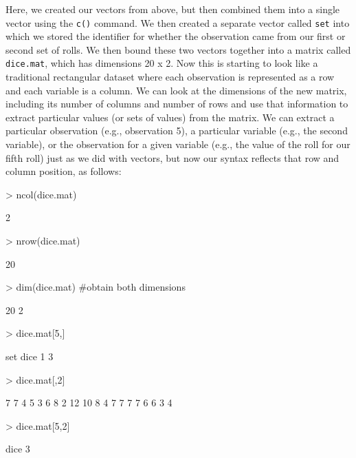\documentclass[12pt]{article}
\begin{document}
Here, we created our vectors from above, but then combined them into a single vector using the \verb|c()| command. We then created a separate vector called \verb|set| into which we stored the identifier for whether the observation came from our first or second set of rolls. We then bound these two vectors together into a matrix called \verb|dice.mat|, which has dimensions 20 x 2. Now this is starting to look like a traditional rectangular dataset where each observation is represented as a row and each variable is a column. We can look at the dimensions of the new matrix, including its number of columns and number of rows and use that information to extract particular values (or sets of values) from the matrix. We can extract a particular observation (e.g., observation 5), a particular variable (e.g., the second variable), or the observation for a given variable (e.g., the value of the roll for our fifth roll) just as we did with vectors, but now our syntax reflects that row and column position, as follows:
\begin{Schunk}
\begin{Sinput}
> ncol(dice.mat)
\end{Sinput}
\begin{Soutput}
[1] 2
\end{Soutput}
\begin{Sinput}
> nrow(dice.mat)
\end{Sinput}
\begin{Soutput}
[1] 20
\end{Soutput}
\begin{Sinput}
> dim(dice.mat) #obtain both dimensions
\end{Sinput}
\begin{Soutput}
[1] 20  2
\end{Soutput}
\begin{Sinput}
> dice.mat[5,]
\end{Sinput}
\begin{Soutput}
 set dice 
   1    3 
\end{Soutput}
\begin{Sinput}
> dice.mat[,2]
\end{Sinput}
\begin{Soutput}
 [1]  7  7  4  5  3  6  8  2 12 10  8  4  7  7  7  7  6  6  3  4
\end{Soutput}
\begin{Sinput}
> dice.mat[5,2]
\end{Sinput}
\begin{Soutput}
dice 
   3 
\end{Soutput}
\end{Schunk}
\end{document}
